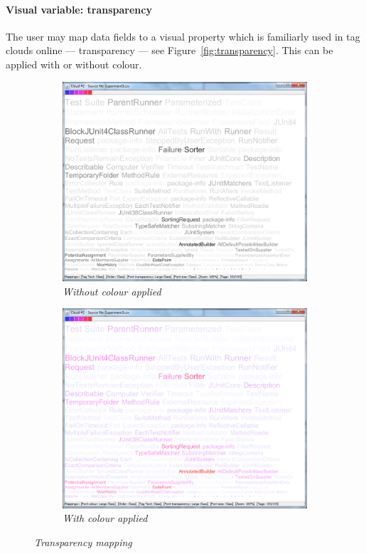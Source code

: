\paragraph{Visual variable: transparency} The user may map data fields to a visual property which is familiarly used in tag clouds online --- transparency --- see Figure~\vref{fig:transparency}. This can be applied with or without colour.

\begin{figure}[!htb]
\begin{subfigure}{.5\textwidth}
	\centering
	\includegraphics[scale=0.20]{transparency.png}
	\caption{\textit{Without colour applied}}
\end{subfigure}%
\begin{subfigure}{.5\textwidth}
  \centering
  \includegraphics[scale=0.20]{transparency2.png}
  \caption{\textit{With colour applied}}
\end{subfigure}
  	\caption{\textit{Transparency mapping}}
	\label{fig:transparency}
\end{figure}

